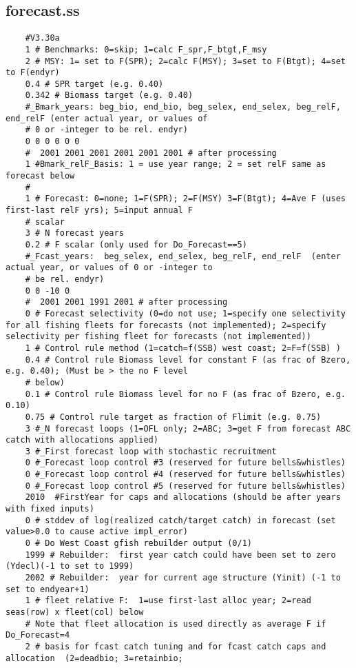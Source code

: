 \begin{landscape}
\subsection{forecast.ss}
\scriptsize{
\begin{verbatim}
	#V3.30a
	1 # Benchmarks: 0=skip; 1=calc F_spr,F_btgt,F_msy 
	2 # MSY: 1= set to F(SPR); 2=calc F(MSY); 3=set to F(Btgt); 4=set to F(endyr) 
	0.4 # SPR target (e.g. 0.40)
	0.342 # Biomass target (e.g. 0.40)
	#_Bmark_years: beg_bio, end_bio, beg_selex, end_selex, beg_relF, end_relF (enter actual year, or values of
	# 0 or -integer to be rel. endyr)
	0 0 0 0 0 0
	#  2001 2001 2001 2001 2001 2001 # after processing 
	1 #Bmark_relF_Basis: 1 = use year range; 2 = set relF same as forecast below
	#
	1 # Forecast: 0=none; 1=F(SPR); 2=F(MSY) 3=F(Btgt); 4=Ave F (uses first-last relF yrs); 5=input annual F
	# scalar
	3 # N forecast years 
	0.2 # F scalar (only used for Do_Forecast==5)
	#_Fcast_years:  beg_selex, end_selex, beg_relF, end_relF  (enter actual year, or values of 0 or -integer to
	# be rel. endyr)
	0 0 -10 0
	#  2001 2001 1991 2001 # after processing
	0 # Forecast selectivity (0=do not use; 1=specify one selectivity for all fishing fleets for forecasts (not implemented); 2=specify selectivity per fishing fleet for forecasts (not implemented))
	1 # Control rule method (1=catch=f(SSB) west coast; 2=F=f(SSB) ) 
	0.4 # Control rule Biomass level for constant F (as frac of Bzero, e.g. 0.40); (Must be > the no F level
	# below) 
	0.1 # Control rule Biomass level for no F (as frac of Bzero, e.g. 0.10) 
	0.75 # Control rule target as fraction of Flimit (e.g. 0.75) 
	3 #_N forecast loops (1=OFL only; 2=ABC; 3=get F from forecast ABC catch with allocations applied)
	3 #_First forecast loop with stochastic recruitment
	0 #_Forecast loop control #3 (reserved for future bells&whistles) 
	0 #_Forecast loop control #4 (reserved for future bells&whistles) 
	0 #_Forecast loop control #5 (reserved for future bells&whistles) 
	2010  #FirstYear for caps and allocations (should be after years with fixed inputs) 
	0 # stddev of log(realized catch/target catch) in forecast (set value>0.0 to cause active impl_error)
	0 # Do West Coast gfish rebuilder output (0/1) 
	1999 # Rebuilder:  first year catch could have been set to zero (Ydecl)(-1 to set to 1999)
	2002 # Rebuilder:  year for current age structure (Yinit) (-1 to set to endyear+1)
	1 # fleet relative F:  1=use first-last alloc year; 2=read seas(row) x fleet(col) below
	# Note that fleet allocation is used directly as average F if Do_Forecast=4 
	2 # basis for fcast catch tuning and for fcast catch caps and allocation  (2=deadbio; 3=retainbio; 

\end{verbatim}}
\end{landscape}
